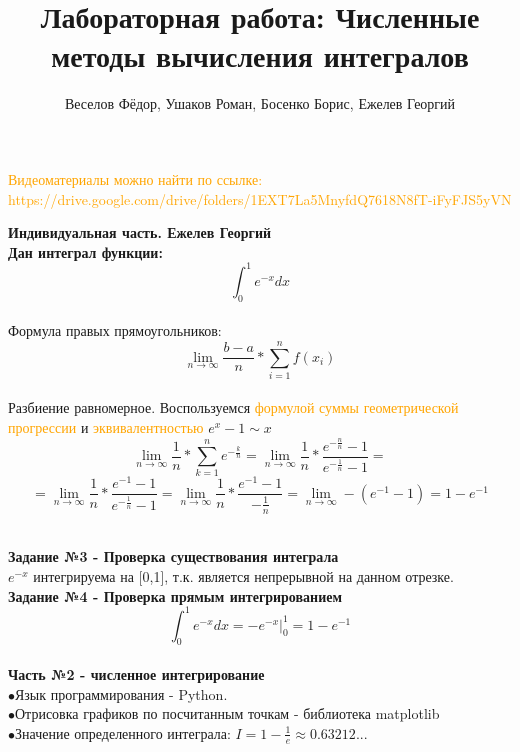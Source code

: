 \documentclass[aspectratio=169]{beamer}
\title[]{Лабораторная работа: Численные методы вычисления интегралов}
\author[]{Веселов Фёдор, Ушаков Роман, Босенко Борис, Ежелев Георгий}
\begin{document}
	\begin{frame}
		\titlepage
	\end{frame}
	
	\begin{frame}
		\textcolor{orange}{\large{Видеоматериалы можно найти по ссылке: https://drive.google.com/drive/folders/1EXT7La5MnyfdQ7618N8fT-iFyFJS5yVN}}\\[1cm]
	\end{frame}
	
	\begin{frame}
		\large \textbf{\textcolor{structure.fg}{Индивидуальная часть. Ежелев Георгий}}\\
		\textbf{Дан интеграл функции: } \[\int_{0}^{1}  e^{-x} dx\]\\
		Формула правых прямоугольников:\\
		\[\lim_{n \to \infty}\frac{b-a}{n}*\sum_{i=1}^{n}f(x_i)\]\\
		Разбиение равномерное. Воспользуемся \textcolor{orange}{формулой суммы геометрической прогрессии} и \textcolor{orange}{эквивалентностью} $e^{x} - 1 \sim x$\\
		\[\lim_{n \to \infty} \frac{1}{n} * \sum_{k=1}^{n} e^{-\frac{k}{n}} = \lim_{n \to \infty} \frac{1}{n} * \frac{e^{-\frac{n}{n}} - 1 }{e^{-\frac{1}{n}} - 1} =\]\[= \lim_{n \to \infty} \frac{1}{n} * \frac{e^{-1} - 1 }{e^{-\frac{1}{n}} - 1} = \lim_{n \to \infty} \frac{1}{n} * \frac{e^{-1} - 1}{-\frac{1}{n}} = \lim_{n \to \infty} -(e^{-1} - 1) = \boxed{1 - e^{-1}}\]\\
	\end{frame}
	\begin{frame}
		\large \textbf{\textcolor{structure.fg}{Задание №3 - Проверка существования интеграла}}\\
	\(e^{-x}\) интегрируема на [0,1], т.к. является непрерывной на данном отрезке.\\
	\large \textbf{\textcolor{structure.fg}{Задание №4 - Проверка прямым интегрированием}}\\
	\[\int_{0}^{1}  e^{-x} dx = -e^{-x}\Big\vert_{0}^{1} = \boxed{1 - e^{-1}}\]\\

	\large \textbf{\textcolor{structure.fg}{Часть №2 - численное интегрирование}}\\
	$\bullet$Язык программирования - Python.\\
	$\bullet$Отрисовка графиков по посчитанным точкам - библиотека matplotlib\\
	$\bullet$Значение определенного интеграла: \(I = 1-\frac{1}{e} \approx 0.63212...\)\\
	\end{frame}
\end{document}
